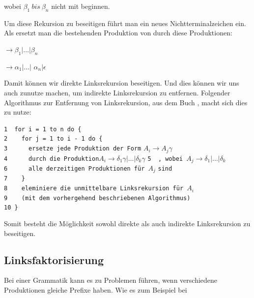 \noindent wobei $\beta_1\ bis\ \beta_n$ nicht mit 
beginnen.\vspace{10pt}

\noindent Um diese Rekursion zu beseitigen führt man ein neues
Nichtterminalzeichen  ein. Als ersetzt man die bestehenden Produktion von
 durch diese Produktionen:\vspace{10pt}

 $\to \beta_1 | \ldots | \beta_n$

 $\to \alpha_1$$|\ldots|$
$\alpha_n$$|\epsilon$\vspace{10pt}

\noindent Damit können wir direkte Linksrekursion beseitigen. Und dies können wir
uns auch zunutze machen, um indirekte Linksrekursion zu entfernen. Folgender
Algorithmus zur Entfernung von Linksrekursion, aus dem Buch \cite{Compilers},
macht sich dies zu nutze:\vspace{10pt}

\noindent
\verb|1  for i = 1 to n do {|\\
\verb|2    for j = 1 to i - 1 do {|\\
\verb|3      ersetze jede Produktion der Form| $A_i \to A_j \gamma$ \verb| |\\ 
\verb|4      durch die Produktion|$A_i \to \delta_1\gamma|\ldots|\delta_k\gamma$
\verb|5  , wobei |$A_j \to \delta_1|\ldots|\delta_k$\\ 
\verb|6      alle derzeitigen Produktionen für |$A_j$ \verb|sind|\\ 
\verb|7    }|\\
\verb|8    eleminiere die unmittelbare Linksrekursion für |$A_i$\\
\verb|9    (mit dem vorhergehend beschriebenen Algorithmus)|\\
\verb|10 }|
\vspace{10pt}

Somit besteht die Möglichkeit sowohl direkte als auch indirekte Linksrekursion
zu beseitigen.\vspace{10pt}

\subsection{Linksfaktorisierung}

Bei einer Grammatik kann es zu Problemen führen, wenn verschiedene Produktionen
gleiche Prefixe haben. Wie es zum Beispiel bei \vspace{10pt}

